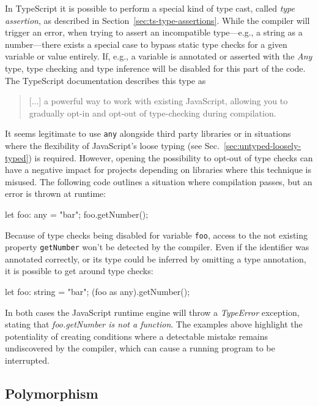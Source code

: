 In TypeScript it is possible to perform a special kind of type cast, called \emph{type assertion}, as described in Section~\ref{sec:ts-type-assertions}. While the compiler will trigger an error, when trying to assert an incompatible type---e.g.,  a string as a number---there exists a special case to bypass static type checks for a given variable or value entirely. If, e.g., a variable is annotated or asserted with the \emph{Any} type, type checking and type inference will be disabled for this part of the code. The TypeScript documentation describes this type as 
\begin{quote}
   [...] a powerful way to work with existing JavaScript, allowing you to gradually opt-in and opt-out of type-checking during compilation.~\cite{TypeScriptHandbook:BasicTypes}
\end{quote}
It seems legitimate to use \texttt{any} alongside third party libraries or in situations where the flexibility of JavaScript's loose typing (see Sec.~\ref{sec:untyped-loosely-typed}) is required. However, opening the possibility to opt-out of type checks can have a negative impact for projects depending on libraries where this technique is misused. The following code outlines a situation where compilation passes, but an error is thrown at runtime:
\begin{JsCode}[numbers=none]
let foo: any = "bar";
foo.getNumber();
\end{JsCode}
Because of type checks being disabled for variable \texttt{foo}, access to the not existing property \texttt{getNumber} won't be detected by the compiler. Even if the identifier was annotated correctly, or its type could be inferred by omitting a type annotation, it is possible to get around type checks:
\begin{JsCode}[numbers=none]
let foo: string = "bar";
(foo as any).getNumber();
\end{JsCode}
In both cases the JavaScript runtime engine will throw a \emph{TypeError} exception, stating that \emph{foo.getNumber is not a function}. The examples above highlight the potentiality of creating conditions where a detectable mistake remains undiscovered by the compiler, which can cause a running program to be interrupted.

\subsection{Polymorphism}

